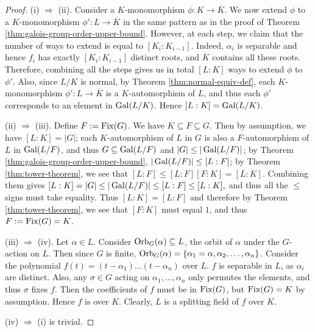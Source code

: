 
\begin{proof}
	
	
	
	(i) $\Rightarrow$ (ii). Consider a $K$-monomorphism $\phi: K \to \overline{K}$. We now extend $\phi$ to a $K$-monomorphism $\phi':L \to \overline{K}$ in the same pattern as in the proof of Theorem \ref{thm:galois-group-order-upper-bound}. However, at each step, we claim that the number of ways to extend is equal to $[K_i : K_{i-1}]$. Indeed, $\alpha_i$ is separable and hence $f_i$ has exactly $[K_i : K_{i-1}]$ distinct roots, and $\overline K$ contains all these roots. Therefore, combining all the steps gives us in total $[L:K]$ ways to extend $\phi$ to $\phi'$. Also, since $L/K$ is normal, by Theorem \ref{thm:normal-equiv-def}, each $K$-monomorphism $\phi': L \to \overline{K}$ is a $K$-automorphism of $L$, and thus each $\phi'$ corresponds to an element in $\operatorname{Gal}(L/K)$. Hence $[L:K] = \operatorname{Gal}(L/K)$. 
	
	(ii) $\Rightarrow$ (iii). Define $F:= \operatorname{Fix}(G)$. We have $K \subseteq F \subseteq G$. Then by assumption, we have $[L:K] = |G|$; each $K$-automorphism of $L$ in $G$ is also a $F$-automorphism of $L$ in $\operatorname{Gal}(L/F)$, and thus $G \subseteq \operatorname{Gal}(L / F)$ and $|G| \le |\operatorname{Gal}(L / F)|$; by Theorem \ref{thm:galois-group-order-upper-bound}, $|\operatorname{Gal}(L/F)| \le [L:F]$; by Theorem \ref{thm:tower-theorem}, we see that $ [L:F] \le [L:F][F:K] = [L:K]$. Combining them gives $
	[L:K] = |G| \le |\operatorname{Gal}(L/F)| \le  [L:F] \le [L:K],
	$
	and thus all the $\le$ signs must take equality.  
	Thus $[L:K]=[L:F]$ and therefore by Theorem \ref{thm:tower-theorem}, we see that $[F:K]$ must equal $1$, and thus $F:=\operatorname{Fix}(G) = K$.
	
	(iii) $\Rightarrow$ (iv). Let $\alpha \in L$. Consider $\operatorname{Orb}_G(\alpha) \subseteq L$, the orbit of $\alpha$ under the $G$-action on $L$. Then since $G$ is finite, $\operatorname{Orb}_G(\alpha) = \{ \alpha_1 = \alpha, \alpha_2, \ldots, \alpha_n\}$. Consider the polynomial $f(t) = (t-\alpha_1) \ldots (t-\alpha_n)$ over $L$.  $f$ is separable in $L$, as $\alpha_i$ are distinct. Also, any $\sigma \in G$ acting on $\alpha_1, \dots, \alpha_n$ only permutes the elements, and thus $\sigma$ fixes $f$. Then the coefficients of $f$ must be in $\operatorname{Fix}(G)$, but $\operatorname{Fix}(G) = K$ by assumption. Hence $f$ is over $K$. Clearly, $L$ is a splitting field of $f$ over $K$. 
	
	(iv) $\Rightarrow$ (i) is trivial.
\end{proof}


